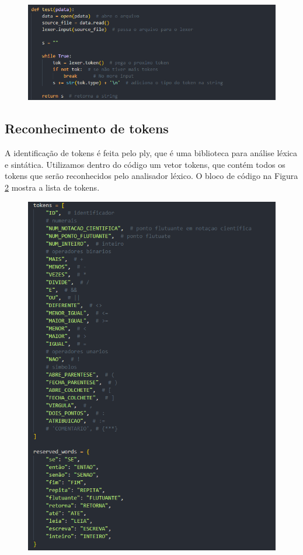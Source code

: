 \documentclass[12pt]{article}
\begin{document}
 
      \begin{figure}[h!]
        \centering
         \includegraphics[scale=0.8]{images/varredura.png}
        \label{fig:f2}
        \end{figure}	

\subsection{Reconhecimento de tokens}
A identificação de tokens é feita pelo ply, que é uma biblioteca para análise léxica e sintática. Utilizamos dentro do código um vetor tokens, que contém todos os tokens que serão reconhecidos pelo analisador léxico. O bloco de código na Figura \ref{fig:f3} mostra a lista de tokens.

 
      \begin{figure}[h!]
        \centering
         \includegraphics[scale=0.8]{images/tokens.png}
        \label{fig:f3}
        \end{figure}
\end{document}
